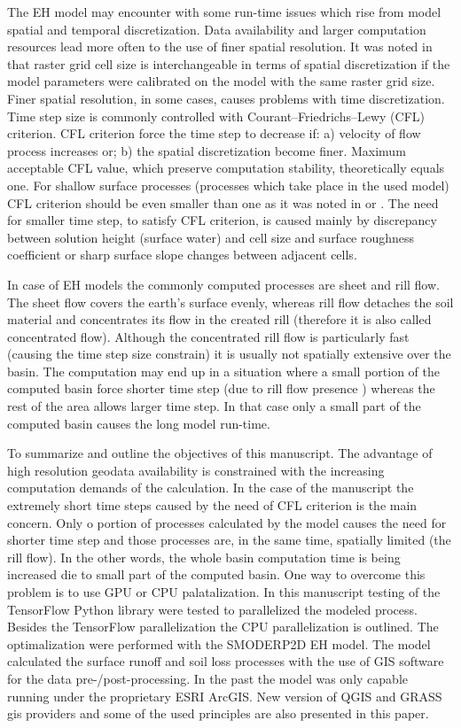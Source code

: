 The EH model may encounter with some run-time issues which 
rise from model spatial and temporal discretization. 
Data availability and larger computation resources lead more often 
to the use of finer spatial resolution. 
It was noted in \cite{molnar2000} that raster grid cell size is interchangeable 
in terms of spatial discretization if the model parameters 
were calibrated on the model with the same raster grid size. 
Finer spatial resolution, in some 
cases, causes problems with time discretization. Time step size is commonly 
controlled with Courant–Friedrichs–Lewy (CFL) criterion. 
CFL criterion force the time step to decrease if: a) velocity of flow 
process increases or; b) the spatial discretization become finer. 
Maximum acceptable CFL value, which preserve computation stability, theoretically equals one. 
For shallow surface processes (processes which take place in the used model)
CFL criterion should 
be even smaller than one as it was noted in \cite{zhang1989}
or \cite{esteves2000}. The need for smaller time step, to satisfy CFL criterion, 
is caused mainly by discrepancy between solution height 
(surface water) and cell size and surface roughness coefficient 
or sharp surface slope changes between adjacent cells. 

In case of EH models the commonly computed processes are sheet 
and 
rill flow. 
The sheet flow covers the earth's surface evenly, whereas rill flow detaches 
the soil material and concentrates its flow in the created rill 
(therefore it is also called concentrated flow).
Although the concentrated rill flow is particularly fast (causing  
the time step size constrain) it is usually not spatially extensive 
over the basin. 
The computation may end up in a situation where a 
small portion of the computed basin force shorter time step 
(due to rill flow presence ) whereas the rest of the area allows larger time step. 
In that case only a small part of the computed basin causes the long model run-time. 

To summarize and outline the objectives of this manuscript. The advantage of high 
resolution geodata availability is constrained with the increasing computation demands
of the calculation. In the case of the manuscript the extremely 
short time steps caused by the need of CFL criterion is the main concern. 
Only o portion of processes calculated by the model causes the need for shorter time step and those 
processes are, in the same time, spatially limited (the rill flow). In the other words, 
the whole basin computation time is being increased die to small part
of the computed basin. One way to overcome this problem is to use 
GPU or CPU palatalization. In this manuscript testing of the TensorFlow Python library 
\cite{tensorflow2015-whitepaper} were tested to parallelized the modeled process. 
Besides the TensorFlow parallelization the CPU parallelization is outlined. 
The optimalization were performed with the SMODERP2D EH model. The model calculated the surface runoff
and soil loss processes with the use of GIS software for the data pre-/post-processing. 
In the past the model was only capable running under the proprietary ESRI ArcGIS. 
New version of QGIS and GRASS gis providers and some of the used principles are also presented in this paper. 

